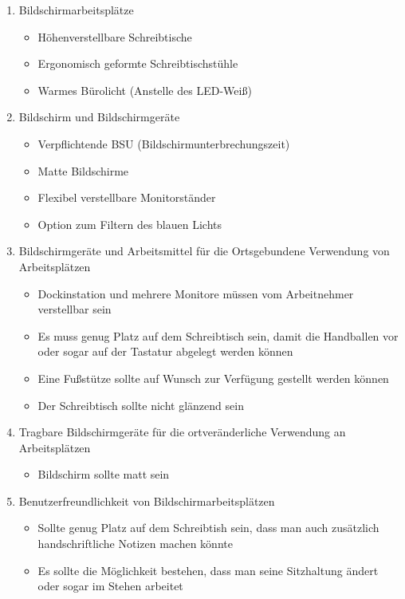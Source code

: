 \documentclass[a4paper, 12pt]{report}
\begin{document}
\begin{enumerate}
    \item Bildschirmarbeitsplätze
	\begin{itemize}
	    \item Höhenverstellbare Schreibtische
	    \item Ergonomisch geformte Schreibtischstühle
	    \item Warmes Bürolicht (Anstelle des LED-Weiß)
	\end{itemize}
    \item Bildschirm und Bildschirmgeräte
	\begin{itemize}
	    \item Verpflichtende BSU (Bildschirmunterbrechungszeit)
	    \item Matte Bildschirme
	    \item Flexibel verstellbare Monitorständer
	    \item Option zum Filtern des blauen Lichts
	\end{itemize}
    \item Bildschirmgeräte und Arbeitsmittel für die Ortsgebundene Verwendung
	von Arbeitsplätzen
	\begin{itemize}
	    \item Dockinstation und mehrere Monitore müssen vom Arbeitnehmer
		verstellbar sein
	    \item Es muss genug Platz auf dem Schreibtisch sein, damit die
		Handballen vor oder sogar auf der Tastatur abgelegt werden
		können
	    \item Eine Fußstütze sollte auf Wunsch zur Verfügung gestellt werden
		können
	    \item Der Schreibtisch sollte nicht glänzend sein
	\end{itemize}
    \item Tragbare Bildschirmgeräte für die ortveränderliche Verwendung an
	Arbeitsplätzen
	\begin{itemize}
	    \item Bildschirm sollte matt sein
	\end{itemize}
    \item Benutzerfreundlichkeit von Bildschirmarbeitsplätzen
	\begin{itemize}
	    \item Sollte genug Platz auf dem Schreibtish sein, dass man auch
		zusätzlich handschriftliche Notizen machen könnte
	    \item Es sollte die Möglichkeit bestehen, dass man seine Sitzhaltung
		ändert oder sogar im Stehen arbeitet
	\end{itemize}
\end{enumerate}
\end{document}
